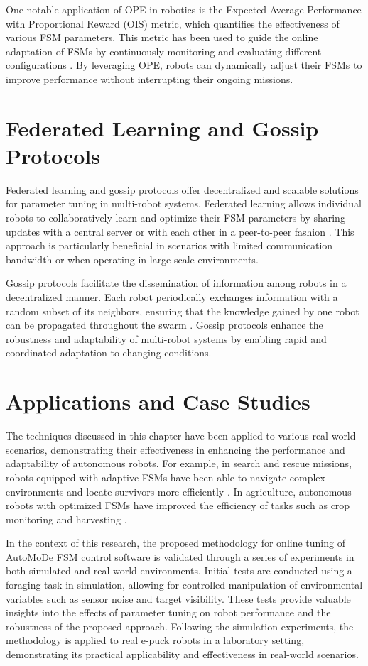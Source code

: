 \documentclass{ULBreport}
\begin{document}
One notable application of OPE in robotics is the Expected Average Performance with Proportional Reward (OIS) metric, which quantifies the effectiveness of various FSM parameters. This metric has been used to guide the online adaptation of FSMs by continuously monitoring and evaluating different configurations \cite{Thomas2015}. By leveraging OPE, robots can dynamically adjust their FSMs to improve performance without interrupting their ongoing missions.

\section{Federated Learning and Gossip Protocols}
Federated learning and gossip protocols offer decentralized and scalable solutions for parameter tuning in multi-robot systems. Federated learning allows individual robots to collaboratively learn and optimize their FSM parameters by sharing updates with a central server or with each other in a peer-to-peer fashion \cite{Konevcny2016}. This approach is particularly beneficial in scenarios with limited communication bandwidth or when operating in large-scale environments.

Gossip protocols facilitate the dissemination of information among robots in a decentralized manner. Each robot periodically exchanges information with a random subset of its neighbors, ensuring that the knowledge gained by one robot can be propagated throughout the swarm \cite{Kempe2003}. Gossip protocols enhance the robustness and adaptability of multi-robot systems by enabling rapid and coordinated adaptation to changing conditions.

\section{Applications and Case Studies}
The techniques discussed in this chapter have been applied to various real-world scenarios, demonstrating their effectiveness in enhancing the performance and adaptability of autonomous robots. For example, in search and rescue missions, robots equipped with adaptive FSMs have been able to navigate complex environments and locate survivors more efficiently \cite{Murphy2008}. In agriculture, autonomous robots with optimized FSMs have improved the efficiency of tasks such as crop monitoring and harvesting \cite{Bechar2016}.

In the context of this research, the proposed methodology for online tuning of AutoMoDe FSM control software is validated through a series of experiments in both simulated and real-world environments. Initial tests are conducted using a foraging task in simulation, allowing for controlled manipulation of environmental variables such as sensor noise and target visibility. These tests provide valuable insights into the effects of parameter tuning on robot performance and the robustness of the proposed approach. Following the simulation experiments, the methodology is applied to real e-puck robots in a laboratory setting, demonstrating its practical applicability and effectiveness in real-world scenarios.
\end{document}

